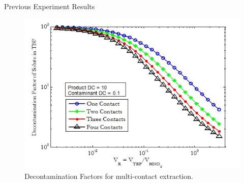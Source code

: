 \documentclass{beamer}
\begin{document}
\begin{frame}{Previous Experiment Results}
  \begin{figure}[H]
    \vspace*{-.1cm}
    \begin{center}
      \includegraphics[scale = 0.6]{figures/df}
      \vspace{-0.5cm}
      \caption{\tiny{Decontamination Factors for multi-contact extraction.}}
    \end{center}
  \end{figure}
\end{frame}
\end{document}
